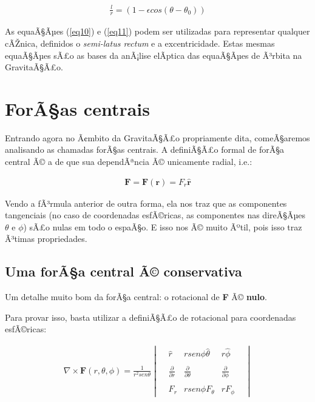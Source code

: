 \begin{eqnarray}
	\frac{l}{r}=(1-\epsilon cos(\theta - \theta_0)) \label{eq11}
\end{eqnarray}

As equaÃ§Ãµes (\ref{eq10}) e (\ref{eq11}) podem ser utilizadas para representar qualquer cÃŽnica, definidos o \textit{semi-latus rectum} e a excentricidade. Estas mesmas equaÃ§Ãµes sÃ£o as bases da anÃ¡lise elÃ­ptica das equaÃ§Ãµes de Ã³rbita na GravitaÃ§Ã£o.

\section{ForÃ§as centrais}

Entrando agora no Ã¢mbito da GravitaÃ§Ã£o propriamente dita, comeÃ§aremos analisando as chamadas forÃ§as centrais. A definiÃ§Ã£o formal de forÃ§a central Ã© a de que sua dependÃªncia Ã© unicamente radial, i.e.:

\begin{eqnarray}
	\mathbf{F} =\mathbf{F}(\mathbf{r}) = F_r \mathbf{\hat{r}} \label{eq12}
\end{eqnarray}

Vendo a fÃ³rmula anterior de outra forma, ela nos traz que as componentes tangenciais (no caso de coordenadas esfÃ©ricas, as componentes nas direÃ§Ãµes $\theta$ e $\phi$) sÃ£o nulas em todo o espaÃ§o. E isso nos Ã© muito Ãºtil, pois isso traz Ã³timas propriedades.

\subsection{Uma forÃ§a central Ã© conservativa}

Um detalhe muito bom da forÃ§a central: o rotacional de \textbf{F} Ã© \textbf{nulo}. {\\}

Para provar isso, basta utilizar a definiÃ§Ã£o de rotacional para coordenadas esfÃ©ricas:

\begin{eqnarray}
	\nabla \times \textbf{F} (r,\theta,\phi) = \frac{1}{r^2sen\theta} \begin{vmatrix} & \hat{r} &rsen\phi\hat{\theta} &  r\hat{\phi} & \\ \\ & \frac{\partial}{\partial r} & \frac{\partial}{\partial \theta} & \frac{\partial}{\partial \phi} & \\ \\ & F_r & rsen\phi F_{\theta} & rF_{\phi} & \end{vmatrix} \label{eq13}	
\end{eqnarray}

